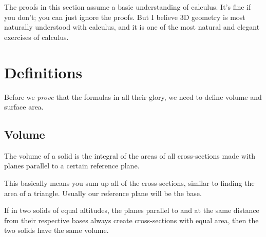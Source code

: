 
The proofs in this section assume a basic understanding of calculus. It's fine if you don't; you can just ignore the proofs. But I believe 3D geometry is most naturally understood with calculus, and it is one of the most natural and elegant exercises of calculus.

\section{Definitions}

Before we \textit{prove} that the formulas in all their glory, we need to define volume and surface area.

\subsection{Volume}

\begin{defi}[Volume]
The volume of a solid is the integral of the areas of all cross-sections made with planes parallel to a certain reference plane.
\end{defi}

This basically means you sum up all of the cross-sections, similar to finding the area of a triangle. Usually our reference plane will be the base.

\begin{fact}
If in two solids of equal altitudes, the planes parallel to and at the same distance from their respective bases always create cross-sections with equal area, then the two solids have the same volume.
\end{fact}

